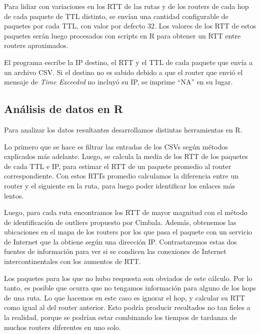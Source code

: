 Para lidiar con variaciones en los RTT de las rutas y de los routers de cada hop
de cada paquete de TTL distinto,
se envían una cantidad configurable de paquetes por cada TTL, con valor por
defecto 32. Los valores de los RTT de estos paquetes serán luego procesados con
scripts en R para obtener un RTT entre routers aproximados.

El programa escribe la IP destino, el RTT y el TTL de cada paquete que envía
a un archivo CSV. Si el destino no es sabido debido a que el router que envió
el mensaje de \emph{Time Exceeded} no incluyó su IP, se imprime ``NA'' en su 
lugar. 

\subsection{Análisis de datos en R}
Para analizar los datos resultantes desarrollamos distintas herramientas en R.

Lo primero que se hace es filtrar las entradas de los CSVs según métodos 
explicados más adelante.
Luego, se calcula la media de los RTT de los
paquetes de cada TTL e IP, para estimar el RTT de un paquete promedio al router
correspondiente. Con estos RTTs promedio calculamos la diferencia entre un 
router y el siguiente en la ruta, para luego poder identificar los enlaces
más lentos. 

Luego, para cada ruta encontramos los RTT de mayor magnitud con
el método de identificación de outliers propuesto por Cimbala. Además,
obtenemos las ubicaciones en el mapa de los routers por los que pasa 
el paquete con un servicio de Internet que la obtiene según una dirección IP.
Contrastaremos estas dos fuentes de información para ver si se condicen las
conexiones de Internet intercontinentales con los aumentos de RTT. 

Los paquetes para los que no hubo respuesta son obviados de este cálculo. 
Por lo tanto, es posible que ocurra que no tengamos información para alguno de 
los hops de una ruta. Lo que hacemos en este caso es ignorar el hop,
y calcular su RTT como igual al del router anterior. Esto podría
producir resultados no tan fieles a la realidad, porque se podrían estar
combinando los tiempos de tardanza de muchos routers diferentes en uno solo.

